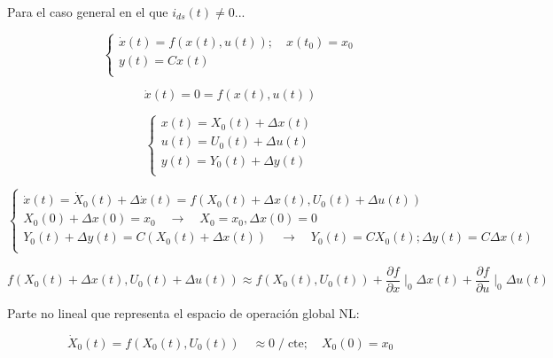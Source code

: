 \documentclass{article}
\begin{document}
Para el caso general en el que ${i}_{ds}(t) \neq 0$... 

\begin{equation}
    \begin{cases}
        \dot{x}(t) = f(x(t),u(t));  \quad   x(t_{0}) = x_{0}\\
        y(t) = Cx(t)\\
    \end{cases}
\end{equation}


\begin{equation}
    \dot{x}(t) = 0 = f(x(t),u(t))
\end{equation}


\begin{equation}
    \begin{cases}
        x(t) = X_{0}(t) + \Delta x(t)\\
        u(t) = U_{0}(t) + \Delta u(t)\\
        y(t) = Y_{0}(t) + \Delta y(t)\\
    \end{cases}
\end{equation}


\begin{equation}
    \begin{cases}
        \dot{x}(t) = \dot{X}_{0}(t) + \Delta\dot{x}(t) = f(X_{0}(t) + \Delta x(t), U_{0}(t) + \Delta u(t))\\
        X_{0}(0) + \Delta x(0) = x_{0} \quad\rightarrow\quad X_{0} = x_{0}, \Delta x(0) = 0 \\
        Y_{0}(t) + \Delta y(t) = C(X_{0}(t) + \Delta x(t)) \quad\rightarrow\quad Y_{0}(t) = C X_{0}(t); \Delta y(t) = C \Delta x(t)\\
    \end{cases}
\end{equation}


\begin{equation}
    f(X_{0}(t) + \Delta x(t), U_{0}(t) + \Delta u (t)) \approx f(X_{0}(t), U_{0}(t)) + \frac{\partial f}{\partial x}\mid_{0}\Delta x(t) + \frac{\partial f}{\partial u}\mid_{0}\Delta u(t)
\end{equation}

Parte no lineal que representa el espacio de operación global NL:

\begin{equation}
    \dot{X}_{0}(t) = f(X_{0}(t), U_{0}(t)) \quad \approx 0 \;/\; \text{cte}; \quad X_{0}(0) = x_{0}
\end{equation}
\end{document}
